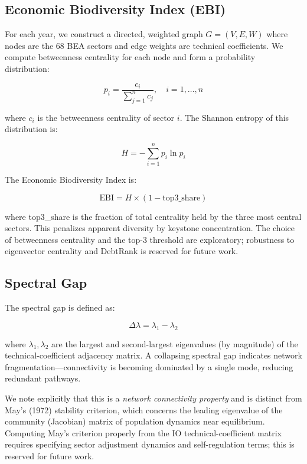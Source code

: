 \documentclass[12pt,a4paper]{article}
\begin{document}
\subsection{Economic Biodiversity Index (EBI)}

For each year, we construct a directed, weighted graph $G = (V, E, W)$ where nodes
are the 68 BEA sectors and edge weights are technical coefficients. We compute
betweenness centrality for each node and form a probability distribution:

\begin{equation}
p_i = \frac{c_i}{\sum_{j=1}^{n} c_j}, \quad i = 1,\ldots,n
\end{equation}

where $c_i$ is the betweenness centrality of sector $i$. The Shannon entropy of this
distribution is:

\begin{equation}
H = -\sum_{i=1}^{n} p_i \ln p_i
\end{equation}

The Economic Biodiversity Index is:

\begin{equation}
\text{EBI} = H \times (1 - \text{top3\_share})
\end{equation}

where top3\_share is the fraction of total centrality held by the three most central
sectors. This penalizes apparent diversity by keystone concentration. The choice of
betweenness centrality and the top-3 threshold are exploratory; robustness to
eigenvector centrality and DebtRank is reserved for future work.

\subsection{Spectral Gap}

The spectral gap is defined as:

\begin{equation}
\Delta \lambda = \lambda_1 - \lambda_2
\end{equation}

where $\lambda_1, \lambda_2$ are the largest and second-largest eigenvalues (by
magnitude) of the technical-coefficient adjacency matrix. A collapsing spectral gap
indicates network fragmentation---connectivity is becoming dominated by a single mode,
reducing redundant pathways.

We note explicitly that this is a \textit{network connectivity property} and is
distinct from May's (1972) stability criterion, which concerns the leading eigenvalue
of the community (Jacobian) matrix of population dynamics near equilibrium. Computing
May's criterion properly from the IO technical-coefficient matrix requires specifying
sector adjustment dynamics and self-regulation terms; this is reserved for future work.
\end{document}
